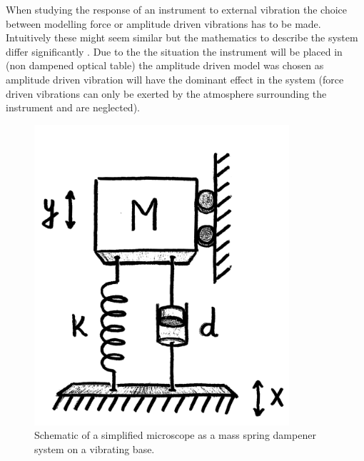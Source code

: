 \documentclass[10pt]{article}
\begin{document}
When studying the response of an instrument to external vibration the choice between modelling force or amplitude driven vibrations has to be made.
Intuitively these might seem similar but the mathematics to describe the system differ significantly \cite{hesselberthMicroscopieBeweging}.
Due to the the situation the instrument will be placed in (non dampened optical table) the amplitude driven model was chosen as amplitude driven vibration will have the dominant effect in the system (force driven vibrations can only be exerted by the atmosphere surrounding the instrument and are neglected).

\begin{figure}[H]
  \centering
  \begin{minipage}[b]{0.30\textwidth}
    \includegraphics[width=\textwidth]{img/resonance/simplified_1DOF_oscilator.png}
    \caption{Schematic of a simplified microscope as a mass spring dampener system on a vibrating base. \cite{hesselberthMicroscopieBeweging}}
    \label{fig:1DOFoscilator}
  \end{minipage}
  \hfill
  \begin{minipage}[b]{0.65\textwidth}

\end{minipage}
\end{figure}
\end{document}
